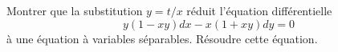 \begin{exercice}\label{exoEquaDiff0007}

Montrer que la substitution $y=t/x$ réduit l'équation différentielle
\begin{equation}
	y(1-xy)dx-x(1+xy)dy=0
\end{equation}
à une équation à variables séparables. Résoudre cette équation.

\end{exercice}
